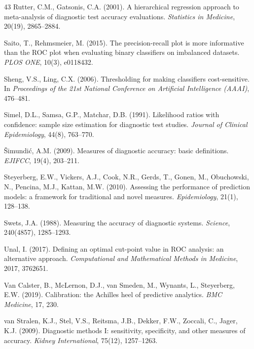 \documentclass[11pt]{article}
\begin{document}
\begin{thebibliography}{43}
Rutter, C.M., Gatsonis, C.A. (2001).
A hierarchical regression approach to meta-analysis of diagnostic test
accuracy evaluations.
\textit{Statistics in Medicine}, 20(19), 2865--2884.

Saito, T., Rehmsmeier, M. (2015).
The precision-recall plot is more informative than the ROC plot when
evaluating binary classifiers on imbalanced datasets.
\textit{PLOS ONE}, 10(3), e0118432.

Sheng, V.S., Ling, C.X. (2006).
Thresholding for making classifiers cost-sensitive.
In \textit{Proceedings of the 21st National Conference on Artificial
Intelligence (AAAI)}, 476--481.

Simel, D.L., Samsa, G.P., Matchar, D.B. (1991).
Likelihood ratios with confidence: sample size estimation for diagnostic
test studies.
\textit{Journal of Clinical Epidemiology}, 44(8), 763--770.

\v{S}imundi\'{c}, A.M. (2009).
Measures of diagnostic accuracy: basic definitions.
\textit{EJIFCC}, 19(4), 203--211.

Steyerberg, E.W., Vickers, A.J., Cook, N.R., Gerds, T., Gonen, M.,
Obuchowski, N., Pencina, M.J., Kattan, M.W. (2010).
Assessing the performance of prediction models: a framework for
traditional and novel measures.
\textit{Epidemiology}, 21(1), 128--138.

Swets, J.A. (1988).
Measuring the accuracy of diagnostic systems.
\textit{Science}, 240(4857), 1285--1293.

Unal, I. (2017).
Defining an optimal cut-point value in ROC analysis: an alternative
approach.
\textit{Computational and Mathematical Methods in Medicine}, 2017,
3762651.

Van Calster, B., McLernon, D.J., van Smeden, M., Wynants, L., Steyerberg,
E.W. (2019).
Calibration: the Achilles heel of predictive analytics.
\textit{BMC Medicine}, 17, 230.

van Stralen, K.J., Stel, V.S., Reitsma, J.B., Dekker, F.W., Zoccali, C.,
Jager, K.J. (2009).
Diagnostic methods I: sensitivity, specificity, and other measures of
accuracy.
\textit{Kidney International}, 75(12), 1257--1263.


\end{thebibliography}
\end{document}
